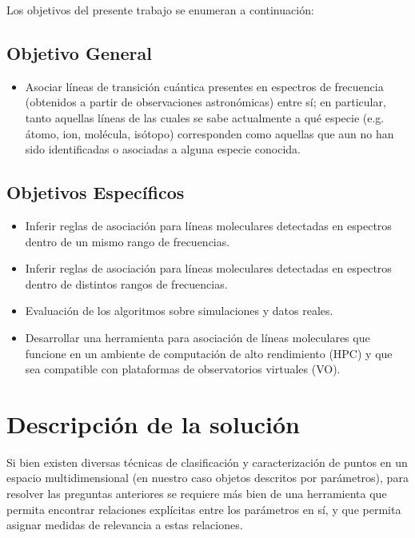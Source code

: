 \begin{intro}
Los objetivos del presente trabajo se enumeran a continuación:

\subsection*{Objetivo General}

\begin{itemize}
	\item Asociar líneas de transición cuántica presentes en espectros de frecuencia (obtenidos a partir de observaciones astronómicas) entre sí; en particular, tanto aquellas líneas de las cuales se sabe actualmente a qué especie (e.g. átomo, ion, molécula, isótopo) corresponden como aquellas que aun no han sido identificadas o asociadas a alguna especie conocida.
\end{itemize}

\subsection*{Objetivos Específicos}

\begin{itemize}
  \item Inferir reglas de asociación para líneas moleculares detectadas en espectros dentro de un mismo rango de frecuencias.
  \item Inferir reglas de asociación para líneas moleculares detectadas en espectros dentro de distintos rangos de frecuencias.
  \item Evaluación de los algoritmos sobre simulaciones y datos reales.
  \item Desarrollar una herramienta para asociación de líneas moleculares que funcione en un ambiente de computación de alto rendimiento (HPC) y que sea compatible con plataformas de observatorios virtuales (VO).
\end{itemize}

\section*{Descripción de la solución}

Si bien existen diversas técnicas de clasificación y caracterización de puntos en un espacio multidimensional (en nuestro caso objetos descritos por parámetros), para resolver las preguntas anteriores se requiere más bien de una herramienta que permita encontrar relaciones explícitas entre los parámetros en sí, y que permita asignar medidas de relevancia a estas relaciones.


\end{intro}
